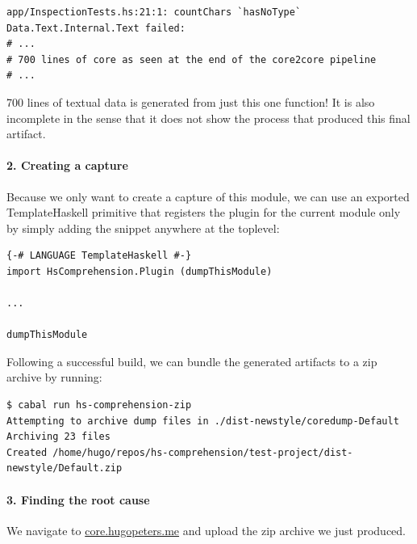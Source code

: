 \begin{verbatim}
app/InspectionTests.hs:21:1: countChars `hasNoType` Data.Text.Internal.Text failed:
# ...
# 700 lines of core as seen at the end of the core2core pipeline
# ...
\end{verbatim}

700 lines of textual data is generated from just this one function!
It is also incomplete in the sense that it does not show the process that produced this final
artifact.

\paragraph{2. Creating a capture}

Because we only want to create a capture of this module, we can use an exported TemplateHaskell primitive
that registers the plugin for the current module only by simply adding the  snippet 
anywhere at the toplevel: 

\begin{listing}[H]
\begin{verbatim}
{-# LANGUAGE TemplateHaskell #-}
import HsComprehension.Plugin (dumpThisModule)

...

dumpThisModule
\end{verbatim}
\end{listing}

Following a successful build, we can bundle the generated artifacts to a zip archive by running:

\begin{listing}[H]
\begin{verbatim}
$ cabal run hs-comprehension-zip
Attempting to archive dump files in ./dist-newstyle/coredump-Default
Archiving 23 files
Created /home/hugo/repos/hs-comprehension/test-project/dist-newstyle/Default.zip
\end{verbatim}
\end{listing}

\paragraph{3. Finding the root cause}
We navigate to \href{https://core.hugopeters.me}{core.hugopeters.me} and upload the zip archive we just
produced.

